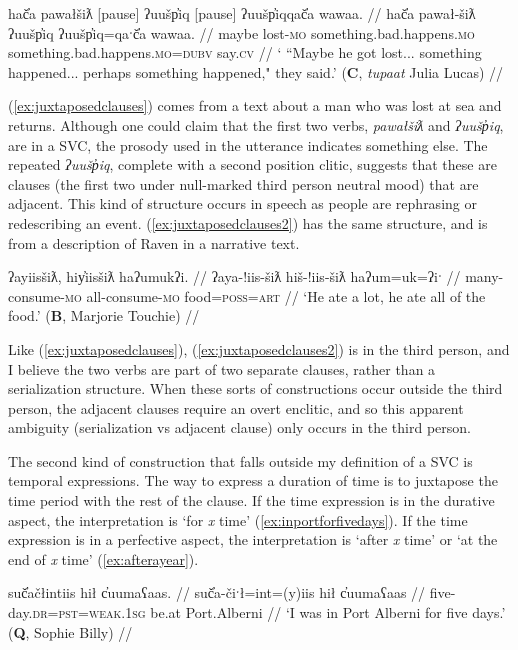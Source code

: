 \ex \label{ex:juxtaposedclauses}
\begingl
\glpreamble hač̓a pawałšiƛ [pause] ʔuušp̓iq [pause] ʔuušp̓iqqač̓a wawaa. //
\gla hač̓a pawał-šiƛ ʔuušp̓iq ʔuušp̓iq=qaˑč̓a wawaa. //
\glb maybe lost-\textsc{mo} something.bad.happens.\textsc{mo} something.bad.happens.\textsc{mo}=\textsc{dubv} say.\textsc{cv} //
\glft ` ``Maybe he got lost... something happened... perhaps something happened," they said.' (\textbf{C}, \textit{tupaat} Julia Lucas) //
\endgl
\xe

(\ref{ex:juxtaposedclauses}) comes from a text about a man who was lost at sea and returns. Although one could claim that the first two verbs, \textit{pawałšiƛ} and \textit{ʔuušp̓iq}, are in a SVC, the prosody used in the utterance indicates something else. The repeated \textit{ʔuušp̓iq}, complete with a second position clitic, suggests that these are clauses (the first two under null-marked third person neutral mood) that are adjacent. This kind of structure occurs in speech as people are rephrasing or redescribing an event. (\ref{ex:juxtaposedclauses2}) has the same structure, and is from a description of Raven in a narrative text.

\ex \label{ex:juxtaposedclauses2}
\begingl
\glpreamble ʔayiisšiƛ, hiy̓iisšiƛ haʔumukʔi. //
\gla ʔaya-!iis-šiƛ hiš-!iis-šiƛ haʔum=uk=ʔiˑ //
\glb many-consume-\textsc{mo} all-consume-\textsc{mo} food=\textsc{poss}=\textsc{art} //
\glft `He ate a lot, he ate all of the food.' (\textbf{B}, Marjorie Touchie) //
\endgl
\xe

Like (\ref{ex:juxtaposedclauses}), (\ref{ex:juxtaposedclauses2}) is in the third person, and I believe the two verbs are part of two separate clauses, rather than a serialization structure. When these sorts of constructions occur outside the third person, the adjacent clauses require an overt enclitic, and so this apparent ambiguity (serialization vs adjacent clause) only occurs in the third person.

The second kind of construction that falls outside my definition of a SVC is temporal expressions. The way to express a duration of time is to juxtapose the time period with the rest of the clause. If the time expression is in the durative aspect, the interpretation is `for \textit{x} time' (\ref{ex:inportforfivedays}). If the time expression is in a perfective aspect, the interpretation is `after \textit{x} time' or `at the end of \textit{x} time' (\ref{ex:afterayear}).

\ex \label{ex:inportforfivedays}
\begingl
\glpreamble suč̓ačłintiis hił c̓uumaʕaas. //
\gla suč̓a-čiˑł=int=(y)iis hił c̓uumaʕaas //
\glb five-day.\textsc{dr}=\textsc{pst}=\textsc{weak.1sg} be.at Port.Alberni //
\glft `I was in Port Alberni for five days.' (\textbf{Q}, Sophie Billy) //
\endgl
\xe

